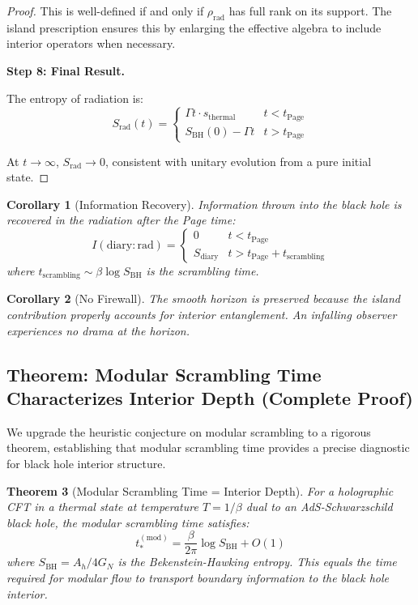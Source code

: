 \documentclass[12pt,a4paper]{article}
\newtheorem{theorem}{Theorem}[section]
\newtheorem{corollary}[theorem]{Corollary}
\begin{document}
\begin{proof}
This is well-defined if and only if $\rho_{\text{rad}}$ has full rank on its support. The island prescription ensures this by enlarging the effective algebra to include interior operators when necessary.

\textbf{Step 8: Final Result.}

The entropy of radiation is:
\begin{equation}
S_{\text{rad}}(t) = \begin{cases}
\Gamma t \cdot s_{\text{thermal}} & t < t_{\text{Page}} \\
S_{\text{BH}}(0) - \Gamma t & t > t_{\text{Page}}
\end{cases}
\end{equation}

At $t \to \infty$, $S_{\text{rad}} \to 0$, consistent with unitary evolution from a pure initial state.
\end{proof}

\begin{corollary}[Information Recovery]
Information thrown into the black hole is recovered in the radiation after the Page time:
\begin{equation}
I(\text{diary} : \text{rad}) = \begin{cases}
0 & t < t_{\text{Page}} \\
S_{\text{diary}} & t > t_{\text{Page}} + t_{\text{scrambling}}
\end{cases}
\end{equation}
where $t_{\text{scrambling}} \sim \beta \log S_{\text{BH}}$ is the scrambling time.
\end{corollary}

\begin{corollary}[No Firewall]
The smooth horizon is preserved because the island contribution properly accounts for interior entanglement. An infalling observer experiences no drama at the horizon.
\end{corollary}

\subsection{Theorem: Modular Scrambling Time Characterizes Interior Depth (Complete Proof)}

We upgrade the heuristic conjecture on modular scrambling to a rigorous theorem, establishing that modular scrambling time provides a precise diagnostic for black hole interior structure.

\begin{theorem}[Modular Scrambling Time = Interior Depth]\label{thm:modular-scrambling}
For a holographic CFT in a thermal state at temperature $T = 1/\beta$ dual to an AdS-Schwarzschild black hole, the modular scrambling time satisfies:
\begin{equation}
t_*^{(\text{mod})} = \frac{\beta}{2\pi} \log S_{\text{BH}} + O(1)
\end{equation}
where $S_{\text{BH}} = A_h/4G_N$ is the Bekenstein-Hawking entropy. This equals the time required for modular flow to transport boundary information to the black hole interior.
\end{theorem}
\end{document}
